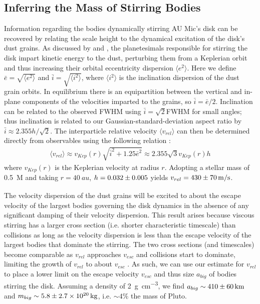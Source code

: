 \documentclass[modern]{aastex62}
\begin{document}
\subsection{Inferring the Mass of Stirring Bodies}
\label{inferring mass}

Information regarding the bodies dynamically stirring AU Mic's disk can be recovered by relating the scale height to the dynamical excitation of the disk's dust grains.
As discussed by \citet{thebault09} and \citet{quillen07}, the planetesimals responsible for stirring the disk impart kinetic energy to the dust, perturbing them from a Keplerian orbit and thus increasing their orbital eccentricity dispersion $\langle e^2 \rangle$. 
Here we define $\bar{e} = \sqrt{\langle e^2 \rangle}$ and $\bar{i} = \sqrt{\langle i^2 \rangle}$, where $\langle i^2 \rangle$ is the inclination dispersion of the dust grain orbits.
In equilibrium there is an equipartition between the vertical and in-plane components of the velocities imparted to the grains, so $\bar{i} = {\bar{e}}/{2}$.
Inclination can be related to the observed FWHM using $\bar{i} = \sqrt{2}$FWHM for small angles; thus inclination is related to our Gaussian-standard-deviation aspect ratio by $\bar{i} \approx 2.355 h / \sqrt{2}$.
The interparticle relative velocity $\langle v_{rel} \rangle$ can then be determined directly from observables using the following relation \citep{wetherill&stewart93,wyatt&dent02}:
\begin{gather}
  \langle v_{rel} \rangle \approx v_{Kep}(r) \sqrt{\bar{i}^2 + 1.25 \bar{e}^2} \approx 2.355 \sqrt{3} v_{Kep}(r) h
\end{gather}
where $v_{Kep}(r)$ is the Keplerian velocity at radius $r$. 
Adopting a stellar mass of \SI{0.5}{M_\sun} and taking $r = \SI{40}{au}$, $h=\num{0.032 \pm 0.005}$ yields $v_{rel} = \SI{430 \pm 70}{m/s}$.

The velocity dispersion of the dust grains will be excited to about the escape velocity of the largest bodies governing the disk dynamics in the absence of any significant damping of their velocity dispersion. 
This result arises because viscous stirring has a larger cross section (i.e. shorter characteristic timescale) than collisions as long as the velocity dispersion is less than the escape velocity of the largest bodies that dominate the stirring. 
The two cross sections (and timescales) become comparable as $v_{rel}$ approaches $v_{esc}$ and collisions start to dominate, limiting the growth of $v_{rel}$ to about $v_{esc}$ \citep[e.g.,][]{schlichting14}.
As such, we can use our estimate for $v_{rel}$ to place a lower limit on the escape velocity $v_{esc}$ and thus size $a_{big}$ of bodies stirring the disk.
Assuming a density of \SI{2}{\g.\cm^{-3}}, we find $a_{big} \sim \SI{410 \pm 60}{km}$ and $m_{big} \sim \SI{5.8 \pm 2.7e20}{kg}$, i.e. $\sim 4\%$ the mass of Pluto.
\end{document}
